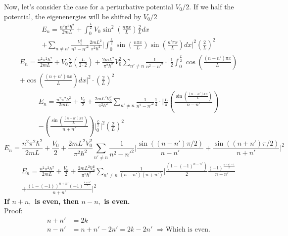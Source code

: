 \documentclass[12pt]{article}
\begin{document}
Now, let's consider the case for a perturbative potential $V_0/2$.
If we half the potential, the eigenenergies will be shifted by $V_0/2$
\begin{multline*}
	E_n = \frac{n^2 \pi^2 \hbar^2}{2mL} + \int_{0}^{\frac{L}{2}} V_0 \sin^2 \left(\frac{n\pi x}
	{L}\right)\frac{2}{L} dx\\
	+ \sum_{n\neq n'} \frac{V^2_0}{n^2 - n'^2} \frac{2mL^2}{\pi^2 \hbar^2}\bigg|\int_{0}^{\frac{L}{2}}
	\sin\left(\frac{n\pi x}{L}\right)\sin\left(\frac{n'\pi x}{L}\right)dx \bigg|^2
	\left(\frac{2}{L}\right)^2
\end{multline*}
\begin{multline*}
	E_n = \frac{n^2 \pi^2 \hbar^2}{2mL} +V_0 \frac{2}{L} \left(\frac{L}{2\cdot 2}\right) + \frac{2mL^2}
	{\pi^2 \hbar^2}V_0^2 \sum_{n'\neq n} \frac{1}{n^2 - n'^2}\cdot \bigg| \frac{1}{2}\int_{0}^
	{\frac{L}{2}} \cos \left(\frac{(n-n')\pi x}{L}\right)\\
	+ \cos \left(\frac{(n+n')\pi x}{L}\right)dx \bigg|^2\cdot \left(\frac{2}{L}\right)^2
\end{multline*}
\begin{multline*}
	E_n = \frac{n^2 \pi^2 \hbar^2}{2mL} + \frac{V_0}{2} + \frac{2mL^2 V^2_0}{\pi^2 \hbar^2}\sum_{n'\neq n}
	\frac{1}{n^2 - n'^2}\frac{1}{4}\cdot \Bigg|\frac{L}{\pi}\left(\frac{\sin\left(\frac{(n-n')x\pi}{L}\right)}
	{n-n'}\right)\\
	-\left(\frac{\sin\left(\frac{(n+n')x\pi}{L}\right)}{n+n'}\right)\Bigg|_{0}^{\frac{L}{2}}\Bigg|^2
\left(\frac{2}{L}\right)^2
\end{multline*}
\begin{equation*}
 E_n = \frac{n^2 \pi^2 \hbar^2}{2mL} + \frac{V_0}{2} + \frac{2mL^2 V^2_0}{\pi^2 \hbar^2}\sum_{n'\neq n}
 \frac{1}{n^2-n'^2}\Bigg|\frac{\sin((n-n')\pi/2)}{n-n'} +\frac{\sin((n+n')\pi/2)}{n+n'}\Bigg|^2
\end{equation*}
\begin{multline*}
 E_n = \frac{n^2 \pi^2 \hbar^2}{2mL} +\frac{V_0}{2} + \frac{2mL^2 V^2_0}{\pi^2 \hbar^2}\sum_{n'\neq n}
 \frac{1}{(n-n')(n+n')}\Bigg|\frac{(1-(-1)^{n-n'})}{2}\frac{(-1)^{\frac{n-n'-1}{2}}}{n-n'}\\
 + \frac{(1-(-1))^{n+n'}(-1)^{\frac{n+n'}{2}}}{n+n'} \Bigg|^2
\end{multline*}
\textbf{If $n+n,$ is even, then $n-n,$ is even.}\\
Proof:
\begin{align*}
	n+n' & = 2k\\
	n-n' & = n+n' -2n'=2k -2n'\,\,\Longrightarrow\text{Which is even.}
\end{align*}
\end{document}
